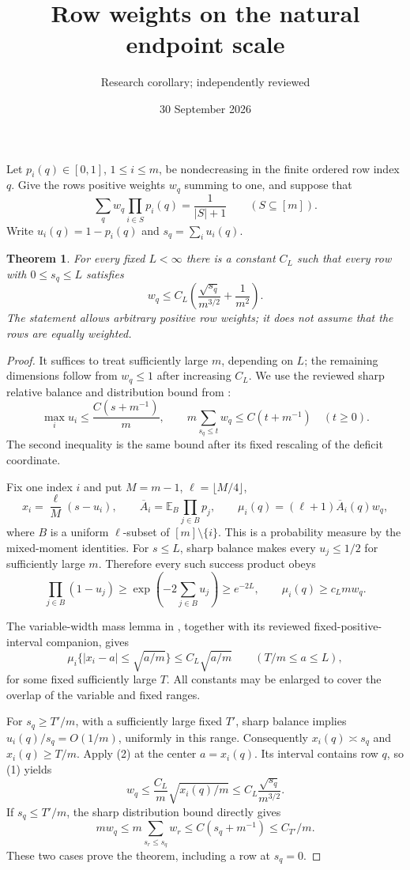 \documentclass[11pt]{article}
\title{Row weights on the natural endpoint scale}
\author{Research corollary; independently reviewed}
\date{30 September 2026}
\newtheorem{theorem}{Theorem}
\newcommand{\E}{\mathbb E}
\begin{document}
\maketitle
Let $p_i(q)\in[0,1]$, $1\le i\le m$, be nondecreasing in the finite
ordered row index $q$. Give the rows positive weights $w_q$ summing
to one, and suppose that
\[
 \sum_qw_q\prod_{i\in S}p_i(q)=\frac1{|S|+1}
                      \qquad(S\subseteq[m]).
\]
Write $u_i(q)=1-p_i(q)$ and $s_q=\sum_i u_i(q)$.

\begin{theorem}
For every fixed $L<\infty$ there is a constant $C_L$ such that every
row with $0\le s_q\le L$ satisfies
\[
 w_q\le C_L\left(\frac{\sqrt{s_q}}{m^{3/2}}+\frac1{m^2}\right).
\]
The statement allows arbitrary positive row weights; it does not
assume that the rows are equally weighted.
\end{theorem}
\begin{proof}
It suffices to treat sufficiently large $m$, depending on $L$;
the remaining dimensions follow from $w_q\le1$ after increasing
$C_L$. We use the reviewed sharp relative balance and distribution
bound from :
\[
 \max_i u_i\le\frac{C(s+m^{-1})}{m},\qquad
 m\sum_{s_q\le t}w_q\le C(t+m^{-1})\quad(t\ge0).
\]
The second inequality is the same bound after its fixed rescaling
of the deficit coordinate.

Fix one index $i$ and put $M=m-1$, $\ell=\lfloor M/4\rfloor$,
\[
 x_i=\frac\ell M(s-u_i),\qquad
 \overline A_i=\E_{B}\prod_{j\in B}p_j,\qquad
 \mu_i(q)=(\ell+1)\overline A_i(q)w_q,
\]
where $B$ is a uniform $\ell$-subset of $[m]\setminus\{i\}$.
This is a probability measure by the mixed-moment identities.
For $s\le L$, sharp balance makes every $u_j\le1/2$ for sufficiently
large $m$. Therefore every such success product obeys
\[
 \prod_{j\in B}(1-u_j)
 \ge\exp\left(-2\sum_{j\in B}u_j\right)\ge e^{-2L},
 \qquad \mu_i(q)\ge c_L m w_q.                 \tag{1}
\]

The variable-width mass lemma in
,
together with its reviewed fixed-positive-interval companion, gives
\[
 \mu_i\{|x_i-a|\le\sqrt{a/m}\}\le C_L\sqrt{a/m}
       \qquad(T/m\le a\le L),                  \tag{2}
\]
for some fixed sufficiently large $T$. All constants may be enlarged
to cover the overlap of the variable and fixed ranges.

For $s_q\ge T'/m$, with a sufficiently large fixed $T'$, sharp
balance implies $u_i(q)/s_q=O(1/m)$, uniformly in this range.
Consequently $x_i(q)\asymp s_q$ and $x_i(q)\ge T/m$.
Apply (2) at the center $a=x_i(q)$. Its interval contains row $q$,
so (1) yields
\[
 w_q\le\frac{C_L}{m}\sqrt{x_i(q)/m}
       \le C_L\frac{\sqrt{s_q}}{m^{3/2}}.
\]
If $s_q\le T'/m$, the sharp distribution bound directly gives
\[
 m w_q\le m\sum_{s_r\le s_q}w_r
       \le C(s_q+m^{-1})\le C_{T'}/m.
\]
These two cases prove the theorem, including a row at $s_q=0$.
\end{proof}
\end{document}
